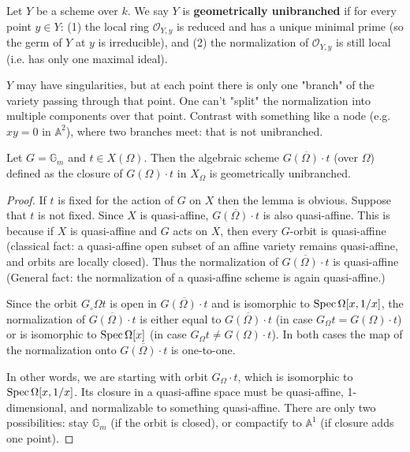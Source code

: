 \documentclass[12pt]{article}
\begin{document}
\begin{definition}
    Let $Y$ be a scheme over $k$. We say $Y$ is \textbf{geometrically unibranched} if for every point $y \in Y$: (1) the local ring $\mathcal{O}_{Y,y}$ is reduced and has a unique minimal prime (so the germ of $Y$ at $y$ is irreducible), and (2) the normalization of $\mathcal{O}_{Y,y}$ is still local (i.e. has only one maximal ideal).
\end{definition}
$Y$ may have singularities, but at each point there is only one "branch" of the variety passing through that point. One can't "split" the normalization into multiple components over that point. Contrast with something like a node (e.g. $xy=0$ in $\mathbb{A}^2$), where two branches meet: that is not unibranched.

\begin{lemma}[2.5]
Let $G = \mathbb{G}_m$ and $t \in X(\Omega)$.  
Then the algebraic scheme $\overline{G(\Omega)\cdot t}$ (over $\Omega$) defined as the closure of $G(\Omega)\cdot t$ in $X_\Omega$ is geometrically unibranched.
\end{lemma}

\begin{proof}
If $t$ is fixed for the action of $G$ on $X$ then the lemma is obvious.  
Suppose that $t$ is not fixed. Since $X$ is quasi-affine, $\overline{G(\Omega)\cdot t}$ is also quasi-affine. This is because if $X$ is quasi-affine and $G$ acts on $X$, then every $G$-orbit is quasi-affine (classical fact: a quasi-affine open subset of an affine variety remains quasi-affine, and orbits are locally closed). Thus the normalization of $\overline{G(\Omega)\cdot t}$ is quasi-affine (General fact: the normalization of a quasi-affine scheme is again quasi-affine.)

Since the orbit $G_\circ\Omega t$ is open in $\overline{G(\Omega)\cdot t}$ and is isomorphic to $\operatorname{Spec} \Omega[x,1/x]$, the normalization of $\overline{G(\Omega)\cdot t}$ is either equal to $\overline{G(\Omega)\cdot t}$ (in case $G_\Omega t = G(\Omega)\cdot t$) or is isomorphic to $\operatorname{Spec} \Omega[x]$ (in case $G_\Omega t \neq G(\Omega)\cdot t$).  
In both cases the map of the normalization onto $\overline{G(\Omega)\cdot t}$ is one-to-one.

In other words, we are starting with orbit $G_\Omega \cdot t$, which is isomorphic to $\operatorname{Spec} \Omega[x,1/x]$. Its closure in a quasi-affine space must be quasi-affine, 1-dimensional, and normalizable to something quasi-affine. There are only two possibilities: stay $\mathbb G_m$ (if the orbit is closed), or compactify to $\mathbb A^1$ (if closure adds one point). 
\end{proof}
\end{document}
